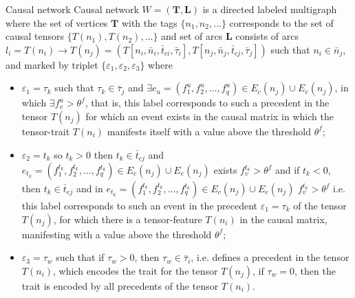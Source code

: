 \documentclass[default]{beamer}
\begin{document}
	\begin{frame}{Causal network}    
		\small                         
		Causal network $W=(\mathbf{T},\mathbf{L})$ is a directed labeled multigraph where the set of vertices $\mathbf{T}$ with the tags $\{{{n}_{1}},{{n}_{2}},...\}$ corresponds to the set of causal tensors $\{T({{n}_{1}}),T ({{n}_{2}}),\dots\}$ and set of arcs $\mathbf{L}$ consists of arcs ${{l}_{i}}=T({{n}_{i}})\to T({{n}_{j}})=(T[{{n}_{i}},{{\bar{n}}_{i}},{{\bar{t}}_{ci}},{{\bar{\tau }}_{i}}],T[{{n}_{j}},{{\bar{n}}_{j}},{{\bar{t}}_{cj}},{{\bar{\tau }}_{j}}])$ such that ${{n}_{i}}\in {{\bar{n}}_{j}}$, and marked by triplet $\{{{\varepsilon }_{1}},{{\varepsilon }_{2}},{{\varepsilon }_{3}}\}$ where
		\begin{itemize}
			\item ${{\varepsilon }_{1}}={{\tau }_{k}}$ such that ${\tau}_{k}\in {\bar{\tau }}_{j}$ and $\exists {{e}_{u}}=(f_{1}^{u},f_{2}^{u},\dots,f_{q}^{u})\in {{E}_{c}} ({n}_{j})\cup {{E}_{e}} ({n}_{j})$, in which $\exists f_{v}^{u}>{{\theta}^{f}}$, that is, this label corresponds to such a precedent in the tensor $T({{n}_{j}})$ for which an event exists in the causal matrix in which the tensor-trait $T({{n}_{i}})$ manifests itself with a value above the threshold ${{\theta }^{f}}$;
			\item ${{\varepsilon}_{2}}={{t}_{k}}$ so ${{t}_{k}}>0$ then ${{t}_{k}}\in {{\bar{t}}_{cj}}$ and  ${{e}_{{{t}_{k}}}}=(f_{1}^{{{t}_{k}}},f_{2}^{{{t}_{k}}},\dots,f_{q}^{{{t}_{k}}})\in {{E}_{c}} ({{n}_{j}})\cup {{E}_{e}}({{n}_{j}})$ exists $f_{v}^{{{t}_{k}}}>{{\theta }^{f}}$ and if ${{t}_{k}}<0$, then ${{t}_{k}}\in {\bar{t}_{ej}}$ and in ${e}_{{{t}_{k}}}=(f_{1}^{{t}_{k}}, f_{2}^{{t}_{k}},\dots,f_{q}^{{{t}_{k}}})\in {{E}_{c}}({{n}_{j}})\cup {{E}_{e}}({{n}_{j}})$ $f_{v}^{{{t}_{k}}}>{{\theta }^{f}}$ i.e. this label corresponds to such an event in the precedent ${{\varepsilon }_{1}}={{\tau }_{k}}$ of the tensor $T({{n}_{j}})$, for which there is a tensor-feature $T({{n}_{i}})$ in the causal matrix, manifesting with a value above the threshold ${{\theta }^{f}}$;
			\item ${{\varepsilon }_{3}}={{\tau }_{w}}$ such that if ${{\tau }_{w}}>0$, then ${{\tau }_{w}}\in {{\bar{\tau }}_{i}}$, i.e. defines a precedent in the tensor $T({{n}_{i}})$, which encodes the trait for the tensor $T ({{n}_{j}})$, if ${{\tau} _{w}}=0$, then the trait is encoded by all precedents of the tensor $T({{n}_{i}})$.
	\end{itemize}
	\end{frame}
\end{document}
